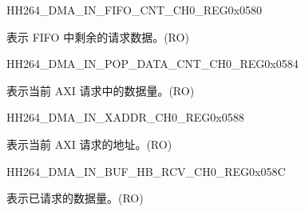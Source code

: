 \begin{register}{H}{H264\_DMA\_IN\_FIFO\_CNT\_CH0\_REG}{0x0580}\label{regdesc:H264DMAINFIFOCNTCH0REG}
%
%
\regnewline%
\begin{regdesc}\begin{reglist}
\label{fielddesc:H264DMAINCMDFIFOINFIFOCNTCH0}\item [H264\_DMA\_IN\_CMDFIFO\_INFIFO\_CNT\_CH0] 表示 FIFO 中剩余的请求数据。(RO)
\end{reglist}\end{regdesc}
\end{register}


\begin{register}{H}{H264\_DMA\_IN\_POP\_DATA\_CNT\_CH0\_REG}{0x0584}\label{regdesc:H264DMAINPOPDATACNTCH0REG}
%
%
\regnewline%
\begin{regdesc}\begin{reglist}
\label{fielddesc:H264DMAINCMDFIFOPOPDATACNTCH0}\item [H264\_DMA\_IN\_CMDFIFO\_POP\_DATA\_CNT\_CH0] 表示当前 AXI 请求中的数据量。(RO)
\end{reglist}\end{regdesc}
\end{register}


\begin{register}{H}{H264\_DMA\_IN\_XADDR\_CH0\_REG}{0x0588}\label{regdesc:H264DMAINXADDRCH0REG}
%
\regnewline%
\begin{regdesc}\begin{reglist}
\label{fielddesc:H264DMAINCMDFIFOXADDRCH0}\item [H264\_DMA\_IN\_CMDFIFO\_XADDR\_CH0] 表示当前 AXI 请求的地址。(RO)
\end{reglist}\end{regdesc}
\end{register}


\begin{register}{H}{H264\_DMA\_IN\_BUF\_HB\_RCV\_CH0\_REG}{0x058C}\label{regdesc:H264DMAINBUFHBRCVCH0REG}
%
%
\regnewline%
\begin{regdesc}\begin{reglist}
\label{fielddesc:H264DMAINCMDFIFOBUFHBRCVCH0}\item [H264\_DMA\_IN\_CMDFIFO\_BUF\_HB\_RCV\_CH0] 表示已请求的数据量。(RO)
\end{reglist}\end{regdesc}
\end{register}

